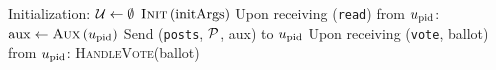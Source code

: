 \begin{algorithm}[H]
  \caption{$\gfunc\left(\textsc{Init}, \textsc{Aux},
  \textsc{HandleVote}\right)\left(\postlist, \mathrm{initArgs}\right)$}
  \label{alg:gfunc}
  \begin{algorithmic}[1]
    \State Initialization:
    \Indent
      \State $\mathcal{U} \gets \emptyset$
      \State $\textsc{Init}\left(\mathrm{initArgs}\right)$
    \EndIndent
    \State
    \State Upon receiving (\texttt{read}) from $u_{\mathrm{pid}}$:
    \Indent
      \State $\mathrm{aux} \gets \textsc{Aux}\left(u_{\mathrm{pid}}\right)$
      \State Send (\texttt{posts}, $\mathcal{P}$, aux) to $u_{\mathrm{pid}}$
    \EndIndent
    \State
    \State Upon receiving (\texttt{vote}, ballot) from
    $u_{\mathrm{pid}}$:
     \Indent
       \State \textsc{HandleVote}(ballot)
     \EndIndent
  \end{algorithmic}
\end{algorithm}
